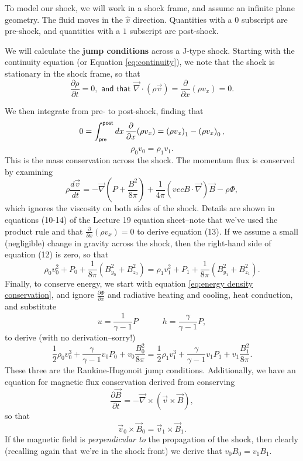 \documentclass{tufte-handout}
\renewcommand{\textbf}[1]{{\bf \textcolor{dark-gray}{#1}}}
\renewcommand{\rm}{\sf}
\renewcommand{\textrm}{\textsf}
\begin{document}
To model our shock, we will work in a shock frame, and assume an infinite plane geometry. The fluid moves in the $\hat x$ direction. Quantities with a $0$ subscript are pre-shock, and quantities with a $1$ subscript are post-shock.

We will calculate the \textbf{jump conditions} across a J-type shock. Starting with the continuity equation (or Equation \ref{eq:continuity}), we note that the shock is stationary in the shock frame, so that
\[\frac{\partial \rho}{\partial t} = 0,\textrm{\ and\ that\ } \vec\nabla \cdot (\rho \vec v) = \frac{\partial}{\partial x} (\rho v_x) = 0.\]

We then integrate from pre- to post-shock, finding that
\[ 0 = \int_{\rm pre}^{\rm post} dx\, \frac{\partial}{\partial x}(\rho v_x) = \left (\rho v_x\right )_1 - \left (\rho v_x\right )_0,\]
\begin{equation}
\rho_0 v_0 = \rho_1 v_1.
\end{equation}
This is the mass conservation across the shock. The momentum flux is conserved by examining
\[\rho \frac{d \vec v}{dt} = - \vec \nabla \left ( P + \frac{B^2}{8\pi}\right ) + \frac{1}{4\pi}\left (vec B \cdot \vec \nabla\right ) \vec B - \rho \Phi,\]
which ignores the viscosity on both sides of the shock. Details are shown in equations (10-14) of the Lecture 19 equation sheet--note that we've used the product rule and that $\frac{\partial}{\partial x}(\rho v_x) = 0 $ to derive equation (13). If we assume a small (negligible) change in gravity across the shock, then the right-hand side of equation (12) is zero, so that
\begin{equation}
\rho_0 v_0^2 + P_0 + \frac{1}{8\pi}\left (B_{y_0}^2 + B_{z_0}^2\right ) = \rho_1 v_1^2 + P_1 + \frac{1}{8\pi}\left (B_{y_1}^2 + B_{z_1}^2\right ).
\end{equation}
Finally, to conserve energy, we start with equation \eqref{eq:energy density conservation}, and ignore $\frac{\partial \Phi}{\partial x}$ and radiative heating and cooling, heat conduction, and substitute
\[u = \frac{1}{\gamma -1}P \hspace{3em} h = \frac{\gamma}{\gamma-1}P,\]
to derive (with no derivation--sorry!)
\begin{equation}
\frac{1}{2}\rho_0 v_0^3 + \frac{\gamma}{\gamma-1} v_0 P_0 + v_0 \frac{B_0^2}{8\pi} = \frac{1}{2}\rho_1 v_1^3 + \frac{\gamma}{\gamma-1} v_1 P_1 + v_1 \frac{B_1^2}{8\pi}.
\end{equation}
These three are the Rankine-Hugonoit jump conditions. Additionally, we have an equation for magnetic flux conservation derived from conserving
\[\frac{\partial \vec B}{\partial t} = - \vec \nabla \times (\vec v \times \vec B),\]
so that \begin{equation}
\vec v_0 \times \vec B_0 = \vec v_1 \times \vec B_1.
\end{equation}
If the magnetic field is \textit{perpendicular to} the propagation of the shock, then clearly (recalling again that we're in the shock front) we derive that $v_0B_0 = v_1B_1$.
\end{document}
